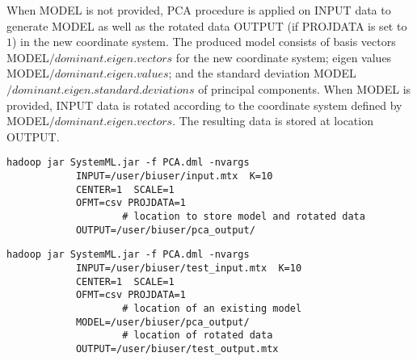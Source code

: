 When MODEL is not provided, PCA procedure is applied on INPUT data to generate MODEL as well as the rotated data OUTPUT (if PROJDATA is set to $1$) in the new coordinate system. 
The produced model consists of basis vectors MODEL$/dominant.eigen.vectors$ for the new coordinate system; eigen values MODEL$/dominant.eigen.values$; and the standard deviation MODEL$/dominant.eigen.standard.deviations$ of principal components.
When MODEL is provided, INPUT data is rotated according to the coordinate system defined by MODEL$/dominant.eigen.vectors$. The resulting data is stored at location OUTPUT.
\\


\begin{verbatim}
hadoop jar SystemML.jar -f PCA.dml -nvargs 
            INPUT=/user/biuser/input.mtx  K=10
            CENTER=1  SCALE=1
            OFMT=csv PROJDATA=1
				    # location to store model and rotated data
            OUTPUT=/user/biuser/pca_output/   
\end{verbatim}

\begin{verbatim}
hadoop jar SystemML.jar -f PCA.dml -nvargs 
            INPUT=/user/biuser/test_input.mtx  K=10
            CENTER=1  SCALE=1
            OFMT=csv PROJDATA=1
				    # location of an existing model
            MODEL=/user/biuser/pca_output/       
				    # location of rotated data
            OUTPUT=/user/biuser/test_output.mtx  
\end{verbatim}



